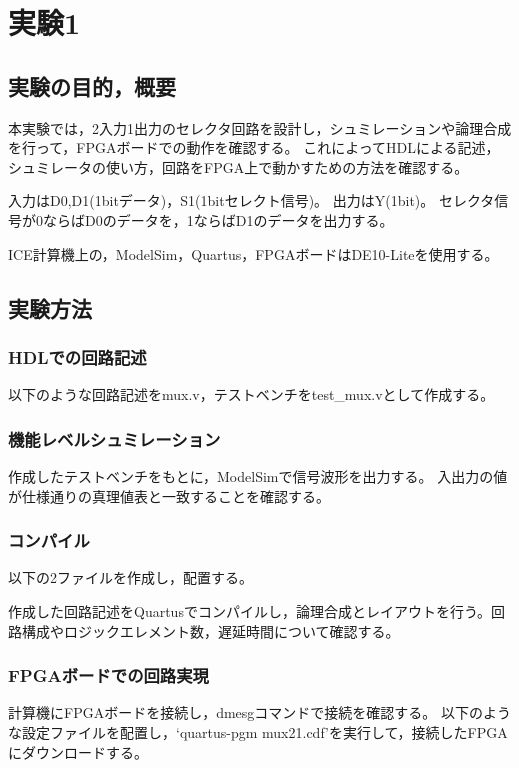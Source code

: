 
\section{実験1}
\subsection{実験の目的，概要}
本実験では，2入力1出力のセレクタ回路を設計し，シュミレーションや論理合成を行って，FPGAボードでの動作を確認する。
これによってHDLによる記述，シュミレータの使い方，回路をFPGA上で動かすための方法を確認する。

入力はD0,D1(1bitデータ)，S1(1bitセレクト信号)。
出力はY(1bit)。
セレクタ信号が0ならばD0のデータを，1ならばD1のデータを出力する。

ICE計算機上の，ModelSim，Quartus，FPGAボードはDE10-Liteを使用する。

\subsection{実験方法}
\subsubsection{HDLでの回路記述}
以下のような回路記述をmux.v，テストベンチをtest\_mux.vとして作成する。



\subsubsection{機能レベルシュミレーション}
作成したテストベンチをもとに，ModelSimで信号波形を出力する。
入出力の値が仕様通りの真理値表と一致することを確認する。

\subsubsection{コンパイル}
以下の2ファイルを作成し，配置する。



作成した回路記述をQuartusでコンパイルし，論理合成とレイアウトを行う。回路構成やロジックエレメント数，遅延時間について確認する。

\subsubsection{FPGAボードでの回路実現}
計算機にFPGAボードを接続し，dmesgコマンドで接続を確認する。
以下のような設定ファイルを配置し，`quartus-pgm mux21.cdf'を実行して，接続したFPGAにダウンロードする。


